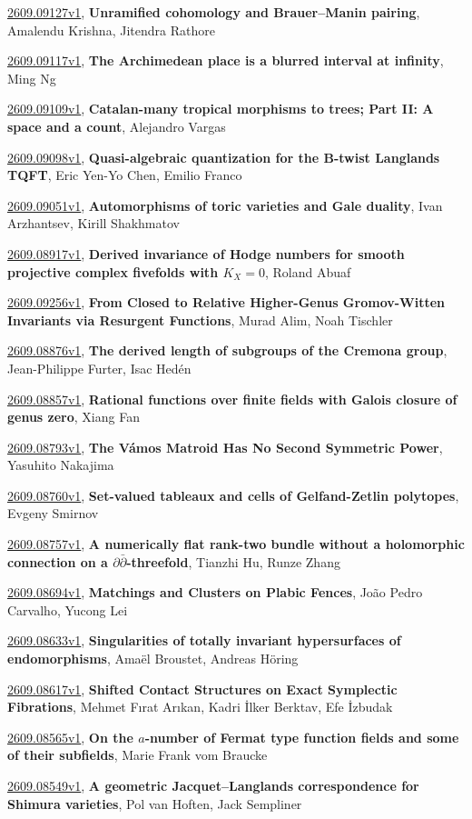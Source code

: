 \documentclass[9pt, a4paper]{article}
\theoremstyle{plain}
\theoremstyle{definition}
\theoremstyle{remark}
\newcommand{\arxiv}[3]{\href{https://arxiv.org/abs/#1}{#1}, \textbf{\textcolor{arxivblue}{#2}}, #3}
\begin{document}
\arxiv{2609.09127v1}{Unramified cohomology and Brauer--Manin pairing}{Amalendu Krishna, Jitendra Rathore}

\arxiv{2609.09117v1}{The Archimedean place is a blurred interval at infinity}{Ming Ng}

\arxiv{2609.09109v1}{Catalan-many tropical morphisms to trees; Part II: A space and a count}{Alejandro Vargas}

\arxiv{2609.09098v1}{Quasi-algebraic quantization for the B-twist Langlands TQFT}{Eric Yen-Yo Chen, Emilio Franco}

\arxiv{2609.09051v1}{Automorphisms of toric varieties and Gale duality}{Ivan Arzhantsev, Kirill Shakhmatov}

\arxiv{2609.08917v1}{Derived invariance of Hodge numbers for smooth projective complex fivefolds with $K_X = 0$}{Roland Abuaf}

\arxiv{2609.09256v1}{From Closed to Relative Higher-Genus Gromov-Witten Invariants via Resurgent Functions}{Murad Alim, Noah Tischler}

\arxiv{2609.08876v1}{The derived length of subgroups of the Cremona group}{Jean-Philippe Furter, Isac Hedén}

\arxiv{2609.08857v1}{Rational functions over finite fields with Galois closure of genus zero}{Xiang Fan}

\arxiv{2609.08793v1}{The Vámos Matroid Has No Second Symmetric Power}{Yasuhito Nakajima}

\arxiv{2609.08760v1}{Set-valued tableaux and cells of Gelfand-Zetlin polytopes}{Evgeny Smirnov}

\arxiv{2609.08757v1}{A numerically flat rank-two bundle without a holomorphic connection on a $\partial\bar\partial$-threefold}{Tianzhi Hu, Runze Zhang}

\arxiv{2609.08694v1}{Matchings and Clusters on Plabic Fences}{João Pedro Carvalho, Yucong Lei}

\arxiv{2609.08633v1}{Singularities of totally invariant hypersurfaces of endomorphisms}{Amaël Broustet, Andreas Höring}

\arxiv{2609.08617v1}{Shifted Contact Structures on Exact Symplectic Fibrations}{Mehmet Fırat Arıkan, Kadri İlker Berktav, Efe İzbudak}

\arxiv{2609.08565v1}{On the $a$-number of Fermat type function fields and some of their subfields}{Marie Frank vom Braucke}

\arxiv{2609.08549v1}{A geometric Jacquet--Langlands correspondence for Shimura varieties}{Pol van Hoften, Jack Sempliner}
\end{document}
